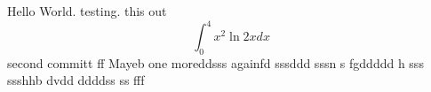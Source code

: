 \documentclass{article}
\begin{document}
Hello World. testing. this out 
$$\int_0^4 x^2 \ln{2x}dx$$
second committ  ff
Mayeb
one moreddsss
againfd
sssddd sssn
s fgddddd h sss
ssshhb dvdd ddddss ss fff
\end{document}

